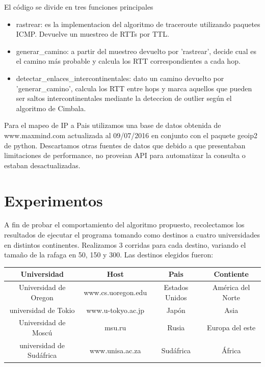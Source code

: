 El código se divide en tres funciones principales
\begin{itemize}
	\item{rastrear: es la implementacion del algoritmo de traceroute utilizando paquetes ICMP. Devuelve un muestreo de RTTs por TTL.}
	\item{generar\_camino: a partir del muestreo devuelto por 'rastrear', decide cual es el camino más probable y calcula los RTT correspondientes a cada hop.}
	\item{detectar\_enlaces\_intercontinentales: dato un camino devuelto por 'generar\_camino', calcula los RTT entre hops y marca aquellos que pueden ser saltos intercontinentales mediante la deteccion de outlier según el algoritmo de Cimbala.}
\end{itemize}	

Para el mapeo de IP a Pais utilizamos una base de datos obtenida de www.maxmind.com actualizada al 09/07/2016 en conjunto con el paquete geoip2 de python. Descartamos otras fuentes de datos que debido a que presentaban limitaciones de performance, no proveian API para automatizar la consulta o estaban desactualizadas. 


\section{Experimentos}
A fin de probar el comportamiento del algoritmo propuesto, recolectamos los resultados de ejecutar el programa tomando como destinos a cuatro universidades en distintos continentes. Realizamos 3 corridas para cada destino, variando el tamaño de la rafaga en 50, 150 y 300.
Las destinos elegidos fueron:

\begin{center}
   \begin{tabular}{ | c | c | c | c | }
     \hline
     \textbf{Universidad} & \textbf{Host} & \textbf{Pais} & \textbf{Contiente} \\ \hline
     Universidad de Oregon & www.cs.uoregon.edu & Estados Unidos & América del Norte\\ \hline
     universidad de Tokio & www.u-tokyo.ac.jp& Japón & Asia\\ \hline
     Universidad de Moscú & msu.ru & Rusia & Europa del este\\ \hline
     universidad de Sudáfrica & www.unisa.ac.za & Sudáfrica & África \\ \hline
   \end{tabular}
 \end{center}
 
